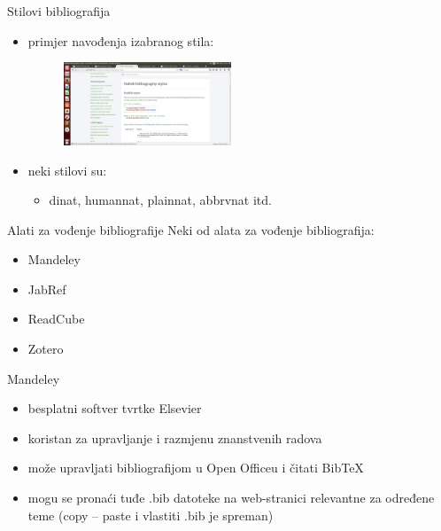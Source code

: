 \documentclass{beamer}
\begin{document}
\begin{frame}{Stilovi bibliografija}
\begin{itemize}
	\item primjer navođenja izabranog stila: \\
	\begin{figure}
	\includegraphics[width=5cm]{natbibprimjer3.png}
	\end{figure}
	\item neki stilovi su:
	\begin{itemize}
			\item dinat, humannat, plainnat, abbrvnat itd.  \\
	\end{itemize}
\end{itemize}
\end{frame}


\begin{frame}{Alati za vođenje bibliografije}
Neki od alata za vođenje bibliografija:
 \begin{itemize}
	\item Mandeley \\
	\item JabRef \\
	\item ReadCube \\
	\item Zotero \\
\end{itemize}
 \end{frame}

 

\begin{frame}{Mandeley}
\begin{itemize}
	\item besplatni softver tvrtke Elsevier \\
	\item koristan za upravljanje i razmjenu znanstvenih radova \\
	\item može upravljati bibliografijom u Open Officeu i čitati BibTeX \\
	\item mogu se pronaći  tuđe .bib datoteke na web-stranici relevantne za  
	određene teme (copy – paste i vlastiti .bib je spreman) \\
\end{itemize}
 \end{frame}
\end{document}
